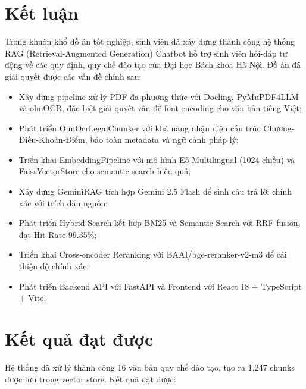 \documentclass[../DoAn.tex]{subfiles}
\begin{document}
\section{Kết luận}

Trong khuôn khổ đồ án tốt nghiệp, sinh viên đã xây dựng thành công hệ thống RAG (Retrieval-Augmented Generation) Chatbot hỗ trợ sinh viên hỏi-đáp tự động về các quy định, quy chế đào tạo của Đại học Bách khoa Hà Nội. Đồ án đã giải quyết được các vấn đề chính sau:

\begin{itemize}
    \item Xây dựng pipeline xử lý PDF đa phương thức với Docling, PyMuPDF4LLM và olmOCR, đặc biệt giải quyết vấn đề font encoding cho văn bản tiếng Việt;
    
    \item Phát triển OlmOcrLegalChunker với khả năng nhận diện cấu trúc Chương-Điều-Khoản-Điểm, bảo toàn metadata và ngữ cảnh pháp lý;
    
    \item Triển khai EmbeddingPipeline với mô hình E5 Multilingual (1024 chiều) và FaissVectorStore cho semantic search hiệu quả;
    
    \item Xây dựng GeminiRAG tích hợp Gemini 2.5 Flash để sinh câu trả lời chính xác với trích dẫn nguồn;
    
    \item Phát triển Hybrid Search kết hợp BM25 và Semantic Search với RRF fusion, đạt Hit Rate 99.35\%;
    
    \item Triển khai Cross-encoder Reranking với BAAI/bge-reranker-v2-m3 để cải thiện độ chính xác;
    
    \item Phát triển Backend API với FastAPI và Frontend với React 18 + TypeScript + Vite.
\end{itemize}

\section{Kết quả đạt được}

Hệ thống đã xử lý thành công 16 văn bản quy chế đào tạo, tạo ra 1,247 chunks được lưu trong vector store. Kết quả đạt được:
\end{document}
